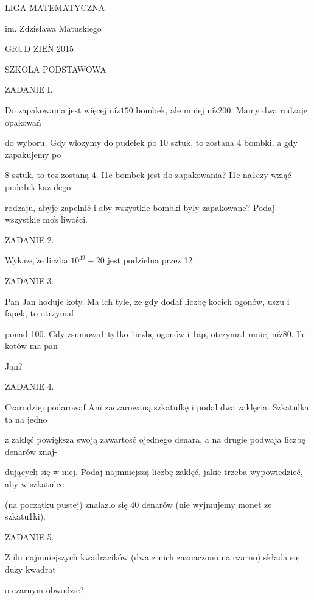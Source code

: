 \documentclass[a4paper,12pt]{article}
\begin{document}
LIGA MATEMATYCZNA

im. Zdzisława Matuskiego

GRUD Z$\mathrm{I}\mathrm{E}\acute{\mathrm{N}}$ 2015

SZKOLA PODSTAWOWA

ZADANIE I.

Do zapakowania jest więcej $\mathrm{n}\mathrm{i}\dot{\mathrm{z}}150$ bombek, ale mniej $\mathrm{n}\mathrm{i}\dot{\mathrm{z}}200$. Mamy dwa rodzaje opakowań

do wyboru. Gdy wlozymy do pudefek po 10 sztuk, to zostana 4 bombki, a gdy zapakujemy po

8 sztuk, to $\mathrm{t}\mathrm{e}\dot{\mathrm{z}}$ zostaną 4. I1e bombek jest do zapakowania? I1e na1ezy wziąć pude1ek $\mathrm{k}\mathrm{a}\dot{\mathrm{z}}$ dego

rodzaju, abyje zapelnić i aby wszystkie bombki byly zapakowane? Podaj wszystkie $\mathrm{m}\mathrm{o}\dot{\mathrm{z}}$ liwości.

ZADANIE 2.

Wykaz$\cdot, \dot{\mathrm{z}}\mathrm{e}$ liczba $10^{49}+20$ jest podzielna przez 12.

ZADANIE 3.

Pan Jan hoduje koty. Ma ich tyle, $\dot{\mathrm{z}}\mathrm{e}$ gdy dodaf liczbę kocich ogonów, uszu i fapek, to otrzymaf

ponad 100. Gdy zsumowa1 ty1ko 1iczbę ogonów i 1ap, otrzyma1 mniej $\mathrm{n}\mathrm{i}\dot{\mathrm{z}}80$. Ile kotów ma pan

Jan?

ZADANIE 4.

Czarodziej podarowaf Ani zaczarowaną szkatufkę i podal dwa zaklęcia. Szkatulka ta na jedno

z zaklęć powiększa swoją zawartość ojednego denara, a na drugie podwaja liczbę denarów znaj-

dujących się w niej. Podaj najmniejszą liczbę zaklęć, jakie trzeba wypowiedzieć, aby w szkatulce

(na początku pustej) znalazlo się 40 denarów (nie wyjmujemy monet ze szkatu1ki).

ZADANIE 5.

$\mathrm{Z}$ ilu najmniejszych kwadracików (dwa z nich zaznaczono na czarno) składa się $\mathrm{d}\mathrm{u}\dot{\mathrm{z}}\mathrm{y}$ kwadrat

o czarnym obwodzie?
\end{document}
